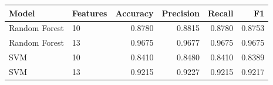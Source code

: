 \begin{tabular}{llrrrr}
\hline
Model & Features & Accuracy & Precision & Recall & F1 \\
\hline
Random Forest & 10 & 0.8780 & 0.8815 & 0.8780 & 0.8753 \\
Random Forest & 13 & 0.9675 & 0.9677 & 0.9675 & 0.9675 \\
SVM & 10 & 0.8410 & 0.8480 & 0.8410 & 0.8389 \\
SVM & 13 & 0.9215 & 0.9227 & 0.9215 & 0.9217 \\
\hline
\end{tabular}
